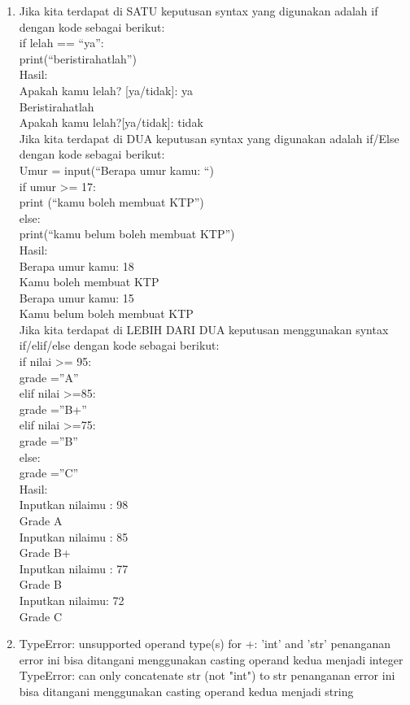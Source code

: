 \begin{enumerate}
	\item Jika kita terdapat di SATU keputusan syntax yang digunakan adalah if dengan kode sebagai 				berikut:\\
	if  lelah == “ya”:\\
  	  print(“beristirahatlah”)\\
	Hasil:\\
	Apakah kamu lelah? [ya/tidak]: ya\\
	Beristirahatlah\\
	Apakah kamu lelah?[ya/tidak]: tidak\\
	Jika kita terdapat di DUA keputusan syntax yang digunakan adalah if/Else dengan kode sebagai berikut:\\
	Umur = input(“Berapa umur kamu: “)\\
	if umur >= 17:\\
  	  print (“kamu boleh membuat KTP”)\\
	else:\\
  	  print(“kamu belum boleh membuat KTP”)\\
	Hasil:\\
	Berapa umur kamu: 18\\
	Kamu boleh membuat KTP\\
	Berapa umur kamu: 15\\
	Kamu belum boleh membuat KTP\\ 
	Jika kita terdapat di LEBIH DARI DUA keputusan menggunakan syntax if/elif/else dengan kode sebagai 			berikut:\\
	if nilai >= 95:\\
  	  grade =”A”\\
	elif nilai >=85:\\
  	  grade =”B+”\\
	elif nilai >=75:\\
  	  grade =”B”\\
	else:\\
  	  grade =”C”\\
	Hasil: \\
	Inputkan nilaimu : 98\\
	Grade A\\
	Inputkan nilaimu : 85\\
	Grade B+\\
	Inputkan nilaimu : 77\\
	Grade B\\
	Inputkan nilaimu: 72\\
	Grade C\\

	
	\item TypeError: unsupported operand type(s) for +: 'int' and 'str' penanganan error ini bisa 				ditangani menggunakan casting operand kedua menjadi integer\\
	TypeError: can only concatenate str (not "int") to str penanganan error ini bisa ditangani 					menggunakan casting operand kedua menjadi string
	

\end{enumerate}
